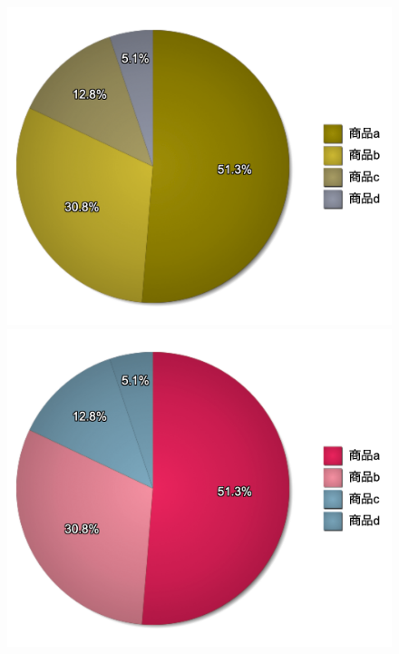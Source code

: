 \begin{figure}[H]
\begin{minipage}[b]{.23\textwidth}
    \end{minipage}
    \begin{minipage}[b]{.23\textwidth}
        \centering
        \includegraphics[keepaspectratio,width=\textwidth]{../../10_UniversalDesign/no2_circle_CC_D.png}
    \end{minipage}
    \begin{minipage}[b]{.23\textwidth}
        \centering
        \includegraphics[keepaspectratio,width=\textwidth]{../../10_UniversalDesign/no2_circle_CC_T.png}

\end{minipage}
\end{figure}
